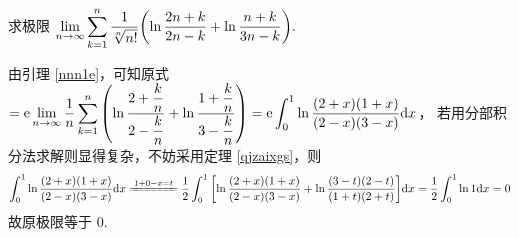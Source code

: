 \begin{example}
    求极限 $\displaystyle\lim_{n\to\infty}\sum_{k=1}^{n}\dfrac{1}{\sqrt[n]{n!}}\qty(\ln\dfrac{2n+k}{2n-k}+\ln\dfrac{n+k}{3n-k}).$
\end{example}
\begin{solution}
    由引理 \ref{nnn1e}，可知原式 $\displaystyle=\mathrm{e}\lim_{n\to\infty}\dfrac{1}{n}\sum_{k=1}^{n}\qty(\ln\dfrac{2+\dfrac{k}{n}}{2-\dfrac{k}{n}}+\ln\dfrac{1+\dfrac{k}{n}}{3-\dfrac{k}{n}})=\mathrm{e}\int_{0}^{1}\ln\dfrac{(2+x)(1+x)}{(2-x)(3-x)}\dd x$，
    若用分部积分法求解则显得复杂，不妨采用定理 \ref{qjzaixgs}，则
    $$\int_{0}^{1}\ln\dfrac{(2+x)(1+x)}{(2-x)(3-x)}\dd x \xlongequal{1+0-x=t}\dfrac{1}{2}\int_{0}^{1}\qty[\ln\dfrac{(2+x)(1+x)}{(2-x)(3-x)}+\ln\dfrac{(3-t)(2-t)}{(1+t)(2+t)}]\dd x=\dfrac{1}{2}\int_{0}^{1}\ln 1\dd x=0$$
    故原极限等于 $0$.
\end{solution}


